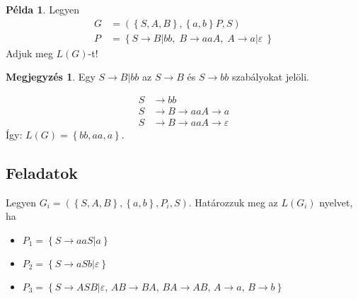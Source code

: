\documentclass[a4paper,12pt]{article}
\theoremstyle{definition}
\newtheorem*{remark}{Megjegyzés}
\newtheorem*{example}{Példa}
\begin{document}
	\begin{example}
		Legyen
		\begin{align*}
			G &= \left( \left\lbrace S, A, B \right\rbrace, \left\lbrace a,b \right\rbrace P, S \right) \\
			P &= \left\lbrace S \rightarrow B | bb, \; B \rightarrow aaA, \; A \rightarrow a | \varepsilon \ \right\rbrace 
		\end{align*}
		Adjuk meg $L(G)$-t!
	
		\begin{remark}
			Egy $ S \rightarrow B | bb $ az $ S \rightarrow B $ és $ S \rightarrow bb $ szabályokat jelöli.
		\end{remark}
	
		\begin{align*}
			S &\rightarrow bb \\
			S &\rightarrow B \rightarrow aaA \rightarrow a \\
			S &\rightarrow B \rightarrow aaA \rightarrow \varepsilon
		\end{align*}
		Így: $L(G) = \left\lbrace bb, aa, a \right\rbrace $. 
	\end{example}

	\subsection{Feladatok}
	
	\begin{question}
		Legyen $ G_i = (\left\lbrace S, A, B \right\rbrace, \left\lbrace a,b \right\rbrace, P_i, S) $. Határozzuk meg az $L(G_i)$ nyelvet, ha
		\begin{itemize}
			\item $P_1 = \left\lbrace S \rightarrow aaS | a \right\rbrace $
			\item $P_2 = \left\lbrace S \rightarrow aSb | \varepsilon \right\rbrace $
			\item $P_3 = \left\lbrace S \rightarrow ASB | \varepsilon, \, AB \rightarrow BA, \, BA \rightarrow AB, \, A \rightarrow a, \, B \rightarrow b \right\rbrace $
		\end{itemize}
	\end{question}
			
\end{document}
